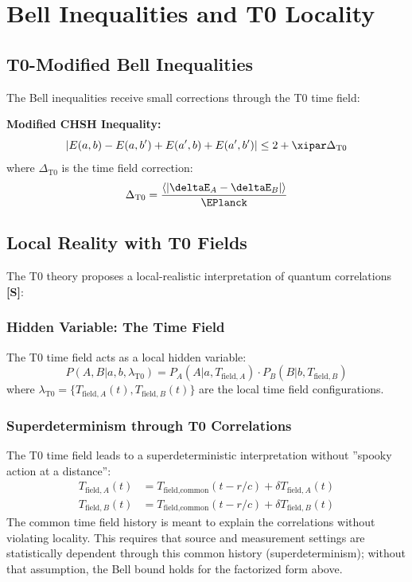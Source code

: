 	\section{Bell Inequalities and T0 Locality}
	\subsection{T0-Modified Bell Inequalities}
	The Bell inequalities receive small corrections through the T0 time field:
	\begin{tcolorbox}[colback=red!5!white,colframe=red!75!black,title={T0 Bell Corrections}]
		\textbf{Modified CHSH Inequality:}
		\begin{equation}
			|E(a,b) - E(a,b') + E(a',b) + E(a',b')| \leq 2 + \xipar \Delta_{\text{T0}}
		\end{equation}
		where $\Delta_{\text{T0}}$ is the time field correction:
		\begin{equation}
			\Delta_{\text{T0}} = \frac{\langle|\deltaE_A - \deltaE_B|\rangle}{\EPlanck}
		\end{equation}
	\end{tcolorbox}
	\subsection{Local Reality with T0 Fields}
	The T0 theory proposes a local-realistic interpretation of quantum correlations \textbf{[S]}:
	\subsubsection{Hidden Variable: The Time Field}
	The T0 time field acts as a local hidden variable:
	\begin{equation}
		P(A,B|a,b,\lambda_{\text{T0}}) = P_A(A|a,T_{\text{field},A}) \cdot P_B(B|b,T_{\text{field},B})
	\end{equation}
	where $\lambda_{\text{T0}} = \{T_{\text{field},A}(t), T_{\text{field},B}(t)\}$ are the local time field configurations.
	\subsubsection{Superdeterminism through T0 Correlations}
	The T0 time field leads to a superdeterministic interpretation without ''spooky action at a distance'':
	\begin{align}
		T_{\text{field},A}(t) &= T_{\text{field},\text{common}}(t-r/c) + \delta T_{\text{field},A}(t) \\
		T_{\text{field},B}(t) &= T_{\text{field},\text{common}}(t-r/c) + \delta T_{\text{field},B}(t)
	\end{align}
	The common time field history is meant to explain the correlations without violating locality. This requires that source and measurement settings are statistically dependent through this common history (superdeterminism); without that assumption, the Bell bound holds for the factorized form above.
